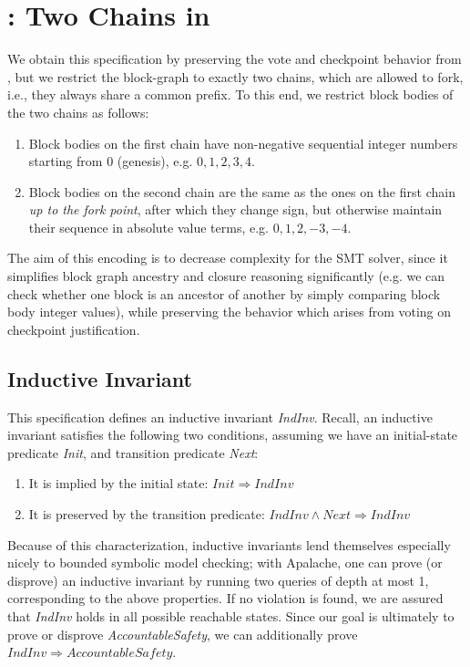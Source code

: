 
\section{\SpecFour{}: Two Chains in \tlap{}}\label{sec:spec4}

We obtain this specification by preserving the vote and checkpoint behavior from \SpecThree{}, but we restrict the block-graph to exactly two chains, which are allowed to fork, i.e., they always share a common prefix.
To this end, we restrict block bodies of the two chains as follows:
\begin{enumerate}
	\item Block bodies on the first chain have non-negative sequential integer numbers starting from 0 (genesis), e.g. $0, 1, 2,3, 4$.
	\item Block bodies on the second chain are the same as the ones on the first chain \emph{up to the fork point}, after which they change sign, but otherwise maintain their sequence in absolute value terms, e.g. $0, 1,2,-3,-4$.
\end{enumerate}

The aim of this encoding is to decrease complexity for the SMT solver, since it simplifies block graph ancestry and closure reasoning significantly (e.g. we can check whether one block is an ancestor of another by simply comparing block body integer values), while preserving the behavior which arises from voting on checkpoint justification.

\subsection{Inductive Invariant}\label{sec:spec4-indinv}

This specification defines an inductive invariant \textit{IndInv}. Recall, an inductive invariant satisfies the following two conditions, assuming we have an initial-state predicate \textit{Init}, and transition predicate \textit{Next}:
\begin{enumerate}
	\item It is implied by the initial state: $\mathit{Init} \Rightarrow \mathit{IndInv}$
	\item It is preserved by the transition predicate: $\mathit{IndInv} \land \mathit{Next} \Rightarrow \mathit{IndInv}$
\end{enumerate}
Because of this characterization, inductive invariants lend themselves especially nicely to bounded symbolic model checking; with Apalache, one can prove (or disprove) an inductive invariant by running two queries of depth at most 1, corresponding to the above properties.
If no violation is found, we are assured that \textit{IndInv} holds in all possible reachable states.
Since our goal is ultimately to prove or disprove \textit{AccountableSafety}, we can additionally prove $\mathit{IndInv} \Rightarrow \mathit{AccountableSafety}$.

